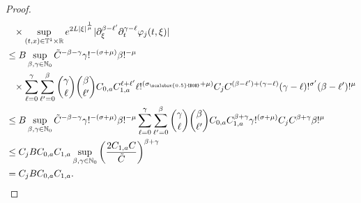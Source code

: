 \documentclass[11pt,reqno]{amsart}
\numberwithin{equation}{section}
\theoremstyle{definition}
\theoremstyle{definition}
\newcommand{\T}{\mathbb{T}}
\newcommand{\R}{\mathbb{R}}
\newcommand{\N}{\mathbb{N}}
\newcommand{\sigmac}{\sigma_{\scalebox{0.5}{$0$}}}
\begin{document}
\begin{proof}
\begin{align*}
        &\phantom{\leq} \times\sup_{(t,x)\in\T^1\times\R}e^{2L|\xi|^{\frac{1}{\mu}}}|\partial_\xi^{\beta-\ell'}\partial_t^{\gamma-\ell}\varphi_j(t,\xi)|\\
        &\leq B\sup_{\beta,\gamma\in\N_0} \tilde{C}^{-\beta-\gamma}\gamma!^{-(\sigma+\mu)}\beta!^{-\mu}\\
         &\phantom{\leq} \times\sum_{\ell=0}^\gamma \sum_{\ell'=0}^\beta\binom{\gamma}{\ell} \binom{\beta}{\ell'}C_{0,a}C_{1,a}^{\ell+\ell'}\ell!^{(\sigmac+\mu)}C_j C^{(\beta-\ell')+(\gamma-\ell)}(\gamma-\ell)!^{\sigma'}(\beta-\ell')!^{\mu}\\
         &\leq B\sup_{\beta,\gamma\in\N_0} \tilde{C}^{-\beta-\gamma}\gamma!^{-(\sigma+\mu)}\beta!^{-\mu}\sum_{\ell=0}^\gamma \sum_{\ell'=0}^\beta\binom{\gamma}{\ell} \binom{\beta}{\ell'}C_{0,a}C_{1,a}^{\beta+\gamma}\gamma!^{(\sigma+\mu)}C_j C^{\beta+\gamma}\beta!^{\mu}\\
         &\leq C_jBC_{0,a} C_{1,a}\sup_{\beta,\gamma\in\N_0}{\left(\frac{2C_{1,a}C}{\tilde{C}}\right)}^{\beta+\gamma}\\
         &= C_jBC_{0,a} C_{1,a}.
    \end{align*}
    

\end{proof}
\end{document}
